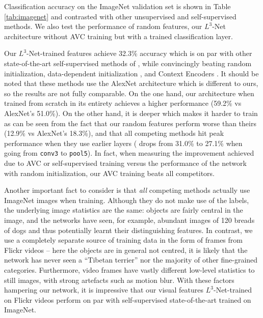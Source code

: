\documentclass[10pt,twocolumn,letterpaper]{article}
\renewcommand{\paragraph}[1]{\smallskip\noindent{\bf{#1}}}
\begin{document}
\figUnitsV
\figUnitsVmap
\afterpage{\FloatBarrier}

\paragraph{Results and discussion.}
Classification accuracy on the ImageNet validation set is shown in
Table \ref{tab:imagenet} and contrasted with other unsupervised and
self-supervised methods.
We also test the performance of random features,
\ie our $L^3$-Net architecture without AVC training but with a trained classification
layer.

Our $L^3$-Net-trained features achieve 32.3\% accuracy which is on par with other
state-of-the-art self-supervised methods of \cite{Doersch15,Zhang16,Donahue17,Noroozi16},
while convincingly beating random initialization,
data-dependent initialization \cite{Krahenbuhl15}, and
Context Encoders \cite{Pathak16}.
It should be noted that these methods use the AlexNet \cite{Krizhevsky12} architecture
which is different to ours,
so the results are not fully comparable.
On the one hand, our architecture when trained from scratch in its entirety
achieves a higher performance (59.2\% vs AlexNet's 51.0\%).
On the other hand, it is deeper which makes it harder to train
as can be seen from the fact that our random features perform worse
than theirs (12.9\% vs AlexNet's 18.3\%), and that all competing methods hit peak
performance when they use earlier layers
(\eg \cite{Donahue17} drops from 31.0\% to 27.1\%
when going from \texttt{conv3} to \texttt{pool5}).
In fact, when measuring the improvement achieved due to AVC or self-supervised
training versus
the performance of the network with random initialization,
our AVC training beats all competitors.
%
%
%

Another important fact to consider is that \emph{all}
competing methods actually use ImageNet images when
training. Although they do not make use of the labels,
the underlying image statistics are the same:
objects are fairly central in the image, and the networks have seen,
for example, abundant images of 120 breads of dogs and thus potentially
learnt their distinguishing features.
In contrast, we use a completely separate source of training data in the
form of frames from Flickr videos -- here the objects are in general not
centred, it is likely that the network has never seen a ``Tibetan terrier''
nor the majority of other fine-grained categories.
Furthermore, video frames have vastly different low-level statistics to
still images, with strong artefacts such as motion blur.
With these factors hampering our network, it is impressive that our
visual features $L^3$-Net-trained on Flickr videos
perform on par with self-supervised state-of-the-art trained on ImageNet.
\end{document}
